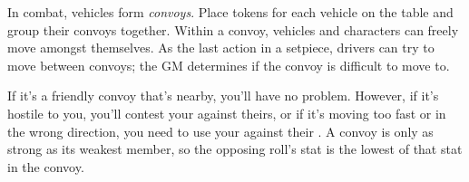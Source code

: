
In combat, vehicles form \emph{convoys}. Place tokens for each vehicle on the table and group their convoys together. Within a convoy, vehicles and characters can freely move amongst themselves. As the last action in a setpiece, drivers can try to move between convoys; the GM determines if the convoy is difficult to move to.

If it's a friendly convoy that's nearby, you'll have no problem. However, if it's hostile to you, you'll contest your  against theirs, or if it's moving too fast or in the wrong direction, you need to use your  against their . A convoy is only as strong as its weakest member, so the opposing roll's stat is the lowest of that stat in the convoy.
